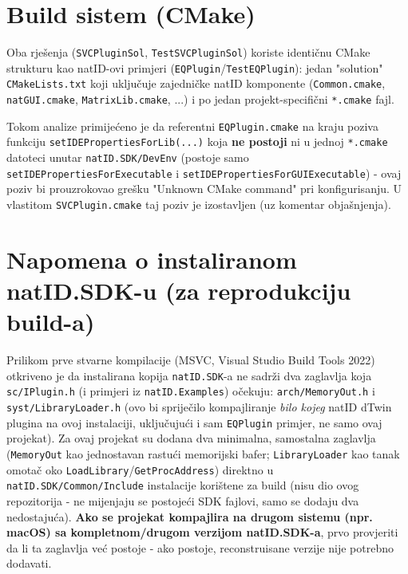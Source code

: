 \documentclass[11pt,a4paper]{report}
\begin{document}
\section{Build sistem (CMake)}

Oba rješenja (\texttt{SVCPluginSol}, \texttt{TestSVCPluginSol}) koriste identičnu CMake
strukturu kao natID-ovi primjeri (\texttt{EQPlugin}/\texttt{TestEQPlugin}): jedan
"solution" \texttt{CMakeLists.txt} koji uključuje zajedničke natID komponente
(\texttt{Common.cmake}, \texttt{natGUI.cmake}, \texttt{MatrixLib.cmake}, ...) i po jedan
projekt-specifični \texttt{*.cmake} fajl.

Tokom analize primijećeno je da referentni \texttt{EQPlugin.cmake} na kraju poziva
funkciju \texttt{setIDEPropertiesFor\allowbreak Lib(...)} koja \textbf{ne postoji} ni u
jednoj \texttt{*.cmake} datoteci unutar \texttt{natID.SDK/DevEnv} (postoje samo
\texttt{setIDEPropertiesFor\allowbreak Executable} i
\texttt{setIDEPropertiesFor\allowbreak GUIExecutable}) - ovaj
poziv bi prouzrokovao grešku "Unknown CMake command" pri konfigurisanju. U vlastitom
\texttt{SVCPlugin.cmake} taj poziv je izostavljen (uz komentar objašnjenja).

\section{Napomena o instaliranom natID.SDK-u (za reprodukciju build-a)}
\label{sec:sdk-napomena}

Prilikom prve stvarne kompilacije (MSVC, Visual Studio Build Tools 2022) otkriveno je da
instalirana kopija \texttt{natID.SDK}-a ne sadrži dva zaglavlja koja \texttt{sc/IPlugin.h}
(i primjeri iz \texttt{natID.Examples}) očekuju: \texttt{arch/MemoryOut.h} i
\texttt{syst/LibraryLoader.h} (ovo bi spriječilo kompajliranje \emph{bilo kojeg} natID
dTwin plugina na ovoj instalaciji, uključujući i sam \texttt{EQPlugin} primjer, ne samo
ovaj projekat). Za ovaj projekat su dodana dva minimalna, samostalna zaglavlja
(\texttt{MemoryOut} kao jednostavan rastući memorijski bafer; \texttt{LibraryLoader} kao
tanak omotač oko \texttt{LoadLibrary}/\texttt{GetProcAddress}) direktno u
\texttt{natID.SDK/Common/Include} instalacije korištene za build (nisu dio ovog
repozitorija - ne mijenjaju se postojeći SDK fajlovi, samo se dodaju dva nedostajuća).
\textbf{Ako se projekat kompajlira na drugom sistemu (npr. macOS) sa kompletnom/drugom
verzijom natID.SDK-a}, prvo provjeriti da li ta zaglavlja već postoje - ako postoje,
reconstruisane verzije nije potrebno dodavati.
\end{document}
